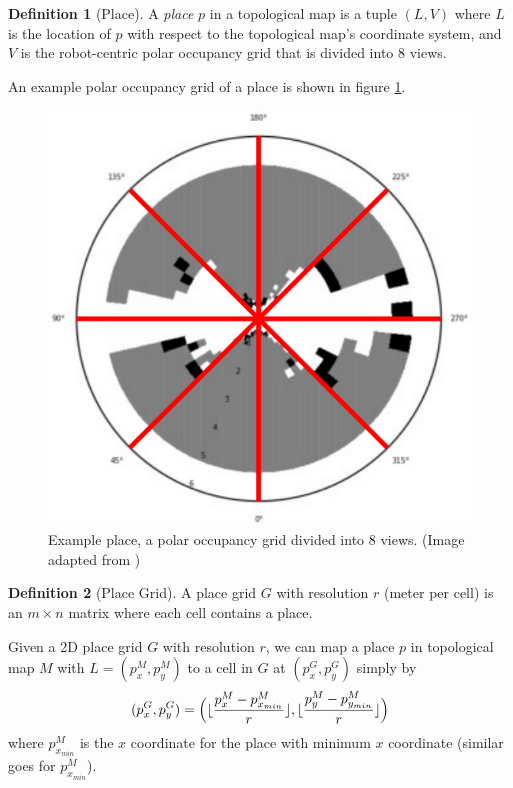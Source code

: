 \documentclass[10pt, titlepage]{article}
\theoremstyle{definition}
\newtheorem{definition}{Definition}[section]
\DeclarePairedDelimiter\floor{\lfloor}{\rfloor}
\begin{document}
\begin{definition}[Place]
A \textit{place} $p$ in a topological map is a tuple $(L, V)$ where $L$ is the location of $p$ with respect to the topological map's coordinate system, and $V$ is the robot-centric polar occupancy grid that is divided into 8 views. 
\end{definition}

\noindent An example polar occupancy grid of a place is shown in figure \ref{fig:place}.

\begin{figure}[!htb]
    \centering
    \captionsetup{width=.5\linewidth}
    \includegraphics[scale=0.15]{images/polar_grid.png}
    \caption{Example place, a polar occupancy grid divided into 8 views. (Image adapted from \cite{pronobis2016learning})}
    \label{fig:place}
\end{figure}

\begin{definition}[Place Grid]
A place grid $G$ with resolution $r$ (meter per cell) is an $m\times n$ matrix where each cell contains a place.
\end{definition}

Given a 2D place grid $G$ with resolution $r$, we can map a place $p$ in topological map $M$ with $L=(p_x^M, p_y^M)$ to a cell in $G$ at $(p_x^G, p_y^G)$ simply by
\begin{equation}
  (p_x^G, p_y^G) = \Big(\floor{\frac{p_x^M-p_{x_{min}}^M}{r}}, \floor{\frac{p_y^M-p_{y_{min}}^M}{r}}\Big)
\end{equation}
where $p_{x_{min}}^M$ is the $x$ coordinate for the place with minimum $x$ coordinate (similar goes for $p_{x_{min}}^M$).
\end{document}
